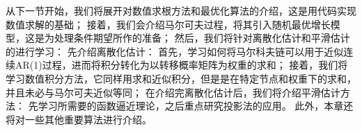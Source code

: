 从下一节开始，我们将展开对数值求根方法和最优化算法的介绍，这是用代码实现数值求解的基础；
接着，我们会介绍马尔可夫过程，将其引入随机最优增长模型，这是为处理条件期望所作的准备；
然后，我们将针对离散化估计和平滑估计的进行学习：
先介绍离散化估计：
首先，学习如何将马尔科夫链可以用于近似连续AR(1)过程，进而将积分转化为以转移概率矩阵为权重的求和；
接着，我们将学习数值积分方法，它同样用求和近似积分，但是是在特定节点和权重下的求和，并且未必与马尔可夫近似等同；
在介绍完离散化估计后，我们将介绍平滑估计方法：
先学习所需要的函数逼近理论，之后重点研究投影法的应用。
此外，本章还将对一些其他重要算法进行介绍。